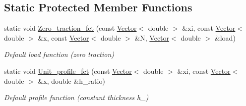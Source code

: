 \subsection*{Static Protected Member Functions}
\begin{DoxyCompactItemize}
\item 
static void \hyperlink{classoomph_1_1KirchhoffLoveBeamEquations_a283a6440586152fe987189d1fcef5a62}{Zero\+\_\+traction\+\_\+fct} (const \hyperlink{classoomph_1_1Vector}{Vector}$<$ double $>$ \&xi, const \hyperlink{classoomph_1_1Vector}{Vector}$<$ double $>$ \&x, const \hyperlink{classoomph_1_1Vector}{Vector}$<$ double $>$ \&N, \hyperlink{classoomph_1_1Vector}{Vector}$<$ double $>$ \&load)
\begin{DoxyCompactList}\small\item\em Default load function (zero traction) \end{DoxyCompactList}\item 
static void \hyperlink{classoomph_1_1KirchhoffLoveBeamEquations_a4bb49aa9866268baf6e6da7385442399}{Unit\+\_\+profile\+\_\+fct} (const \hyperlink{classoomph_1_1Vector}{Vector}$<$ double $>$ \&xi, const \hyperlink{classoomph_1_1Vector}{Vector}$<$ double $>$ \&x, double \&h\+\_\+ratio)
\begin{DoxyCompactList}\small\item\em Default profile function (constant thickness \textquotesingle{}h\+\_\textquotesingle{}) \end{DoxyCompactList}\end{DoxyCompactItemize}
